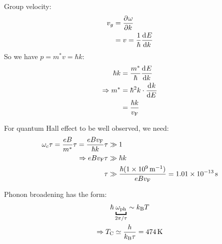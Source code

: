 \begin{parts}
	Group velocity:
	\begin{align*}
		v_g &= \frac{\partial^{}{\omega}}{\partial{}{k}^{}} \\
		&= v = \frac{1}{\hbar} \frac{\mathrm{d}^{}{E}}{\mathrm{d}{k}^{}}
	\end{align*}
	So we have $p = m^* v = \hbar k$:
	\begin{align*}
		\hbar k &= \frac{m^*}{\hbar} \frac{\mathrm{d}^{}{E}}{\mathrm{d}{k}^{}} \\
		\Rightarrow m^* &= \hbar^2 k \cdot \frac{\mathrm{d}^{}{k}}{\mathrm{d}{E}^{}} \\
		&= \frac{\hbar k}{v_\textnormal{F}}
	\end{align*}
	
	For quantum Hall effect to be well observed, we need:
	\begin{align*}
		\omega_c \tau = \frac{eB}{m^*}\tau = \frac{eBv_\textnormal{F}}{\hbar k}\tau &\gg 1 \\
		\Rightarrow eBv_\textnormal{F} \tau &\gg \hbar k \\
		\tau &\gg \frac{\hbar (\SI{1e9}{\per\metre})}{eBv_\textnormal{F}} = \SI{1.01e-13}{\second}
	\end{align*}
	
	Phonon broadening has the form:
	\begin{gather*}
		\hbar\underbracket{\omega_\textnormal{ph}}_{2\pi/\tau} \sim \boltzmann T \\
		\Rightarrow T_\textnormal{C} \simeq \frac{h}{\boltzmann \tau} = \SI{474}{\kelvin}
	\end{gather*}
\end{parts}